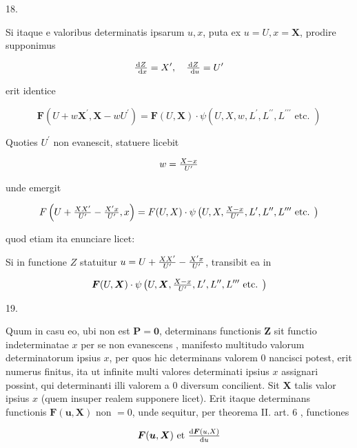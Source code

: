 \documentclass[twoside,12pt, showframe]{memoir}
\let\oldfrac\frac
\def\frac#1#2{\mathchoice{\tfrac{#1}{#2}}{\oldfrac{#1}{#2}}{\genfrac{}{}{}{2}{#1}{#2\mathstrut}}{\genfrac{}{}{}{3}{#1}{#2\mathstrut}}}
\begin{document}
18.

Si itaque e valoribus determinatis ipsarum \(u, x\), puta ex \(u=U, x=\mathbf{X}\), prodire supponimus

\[
\frac{\mathrm{d} Z}{\mathrm{~d} x}=X^{\prime}, \quad \frac{\mathrm{d} Z}{\mathrm{~d} u}=U^{\prime}
\]

erit identice

\[
\boldsymbol{F}\left(U+w \boldsymbol{X}^{\prime}, \boldsymbol{X}-w U^{\prime}\right)=\boldsymbol{F}(U, \boldsymbol{X}) \cdot \psi\left(U, X, w, L^{\prime}, L^{\prime \prime}, L^{\prime \prime \prime} \text { etc. }\right)
\]

Quoties \(U^{\prime}\) non evanescit, statuere licebit

\[
w=\frac{X-x}{U^{\prime}}
\]

unde emergit

\[
F\left(U+\frac{X X^{\prime}}{U^{\prime}}-\frac{X^{\prime} x}{U^{\prime}}, x\right)=F(U, X) \cdot \psi\left(U, X, \frac{X-x}{U^{\prime}}, L^{\prime}, L^{\prime \prime}, L^{\prime \prime \prime} \text { etc. }\right)
\]

quod etiam ita enunciare licet:

Si in functione \(Z\) statuitur \(u=U+\frac{X X^{\prime}}{U^{\prime}}-\frac{X^{\prime} x}{U^{\prime}}\), transibit ea in

\[
\boldsymbol{F}(U, \boldsymbol{X}) \cdot \psi\left(U, \boldsymbol{X}, \frac{X-x}{U^{\prime}}, L^{\prime}, L^{\prime \prime}, L^{\prime \prime \prime} \text { etc. }\right)
\]

19.

Quum in casu eo, ubi non est \(\boldsymbol{P}=\mathbf{0}\), determinans functionis \(\boldsymbol{Z}\) sit functio indeterminatae \(x\) per se non evanescens , manifesto multitudo valorum determinatorum ipsius \(x\), per quos hic determinans valorem 0 nancisci potest, erit numerus finitus, ita ut infinite multi valores determinati ipsius \(x\) assignari possint, qui determinanti illi valorem a 0 diversum concilient. Sit \(\boldsymbol{X}\) talis valor ipsius \(x\) (quem insuper realem supponere licet). Erit itaque determinans functionis \(\boldsymbol{F}(\boldsymbol{u}, \boldsymbol{X})\) non \(=0\), unde sequitur, per theorema II. art. 6 , functiones

\[
\boldsymbol{F}(\boldsymbol{u}, \boldsymbol{X}) \text { et } \frac{\mathrm{d} \boldsymbol{F}(u, X)}{\mathrm{d} u}
\]
\end{document}
